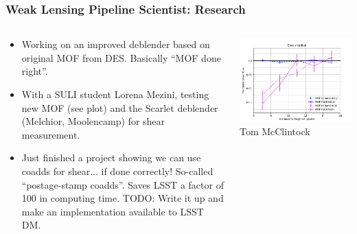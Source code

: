 \documentclass[aspectratio=169]{beamer}
\begin{document}
\frame
{

    \frametitle{Weak Lensing Pipeline Scientist: Research}


    \begin{columns}
        \begin{column}{0.5\textwidth}

            \begin{itemize}

                \item Working on an improved deblender based on original
                    MOF from DES.  Basically ``MOF done right''.

                \item With a SULI student Lorena Mezini, testing new MOF
                    (see plot) and the Scarlet deblender (Melchior, Moolencamp)
                    for shear measurement.

                \item Just finished a project showing we can use coadds
                    for shear... if done correctly!  So-called ``postage-stamp
                    coadds''.  Saves LSST a factor of 100 in computing
                    time. TODO: Write it up and make an implementation
                    available to LSST DM.

            \end{itemize}
        \end{column}
        \begin{column}{0.5\textwidth}
            \begin{center}
                \includegraphics[width=\textwidth]{bias-v-rad-MOF-multiband.png}
                \newline
                {\tiny Tom McClintock}
            \end{center}
        \end{column}

    \end{columns}

}
\end{document}
